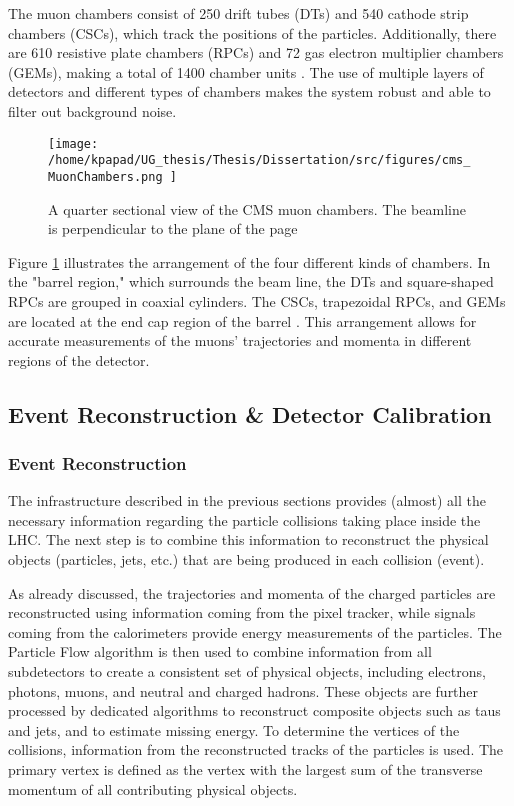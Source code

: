 The muon chambers consist of 250 drift tubes (DTs) and 540 cathode strip chambers (CSCs), which track the positions of the particles. Additionally, there are 610 resistive plate chambers (RPCs) and 72 gas electron multiplier chambers (GEMs), making a total of 1400 chamber units . The use of multiple layers of detectors and different types of chambers makes the system robust and able to filter out background noise.

\begin{figure}[h]
\centering
\texttt{[image: /home/kpapad/UG\_thesis/Thesis/Dissertation/src/figures/cms\_MuonChambers.png ]}
\caption{A quarter sectional view of the CMS muon chambers. The beamline is perpendicular to the plane of the page}
\label{fig:muon_chambers}
\end{figure}

Figure \ref{fig:muon_chambers} illustrates the arrangement of the four different kinds of chambers. In the "barrel region," which surrounds the beam line, the DTs and square-shaped RPCs are grouped in coaxial cylinders. The CSCs, trapezoidal RPCs, and GEMs are located at the end cap region of the barrel . This arrangement allows for accurate measurements of the muons' trajectories and momenta in different regions of the detector.\cite{CMSDetectingMuons}
\subsection{Event Reconstruction \& Detector Calibration}
\label{sec:org3fecb86}
\subsubsection{Event Reconstruction}
\label{sec:orgfae79d0}
The infrastructure described in the previous sections provides (almost) all the necessary information regarding the particle collisions taking place inside the LHC. The next step is to combine this information to reconstruct the physical objects (particles, jets, etc.) that are being produced in each collision (event).

As already discussed, the trajectories and momenta of the charged particles are reconstructed using information coming from the pixel tracker, while signals coming from the calorimeters provide energy measurements of the particles. The Particle Flow algorithm is then used to combine information from all subdetectors to create a consistent set of physical objects, including electrons, photons, muons, and neutral and charged hadrons. These objects are further processed by dedicated algorithms to reconstruct composite objects such as taus and jets, and to estimate missing energy. To determine the vertices of the collisions, information from the reconstructed tracks of the particles is used. The primary vertex is defined as the vertex with the largest sum of the transverse momentum of all contributing physical objects.
